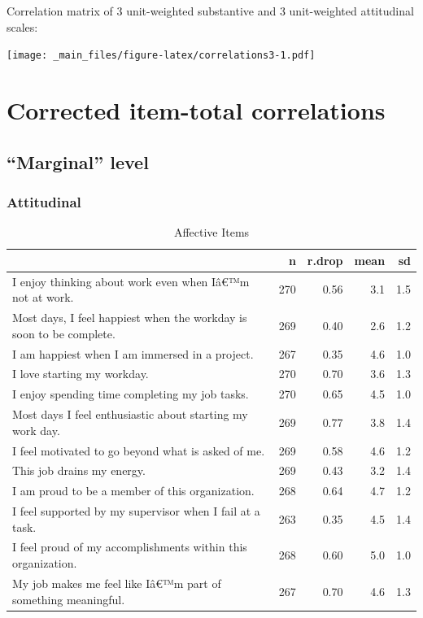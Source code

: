 \documentclass[
]{book}
\begin{document}
Correlation matrix of 3 unit-weighted substantive and 3 unit-weighted attitudinal scales:

\texttt{[image: \_main\_files/figure-latex/correlations3-1.pdf]}

\hypertarget{rdrops}{%
\chapter{Corrected item-total correlations}\label{rdrops}}

\hypertarget{marginal-level}{%
\section{``Marginal'' level}\label{marginal-level}}

\hypertarget{attitudinal}{%
\subsection{Attitudinal}\label{attitudinal}}

\begin{table}

\caption{\label{tab:rdrop1}Affective Items}
\centering
\begin{tabular}[t]{l|r|r|r|r}
\hline
  & n & r.drop & mean & sd\\
\hline
I enjoy thinking about work even when Iâ€™m not at work. & 270 & 0.56 & 3.1 & 1.5\\
\hline
Most days, I feel happiest when the workday is soon to be complete. & 269 & 0.40 & 2.6 & 1.2\\
\hline
I am happiest when I am immersed in a project. & 267 & 0.35 & 4.6 & 1.0\\
\hline
I love starting my workday. & 270 & 0.70 & 3.6 & 1.3\\
\hline
I enjoy spending time completing my job tasks. & 270 & 0.65 & 4.5 & 1.0\\
\hline
Most days I feel enthusiastic about starting my work day. & 269 & 0.77 & 3.8 & 1.4\\
\hline
I feel motivated to go beyond what is asked of me. & 269 & 0.58 & 4.6 & 1.2\\
\hline
This job drains my energy. & 269 & 0.43 & 3.2 & 1.4\\
\hline
I am proud to be a member of this organization. & 268 & 0.64 & 4.7 & 1.2\\
\hline
I feel supported by my supervisor when I fail at a task. & 263 & 0.35 & 4.5 & 1.4\\
\hline
I feel proud of my accomplishments within this organization. & 268 & 0.60 & 5.0 & 1.0\\
\hline
My job makes me feel like Iâ€™m part of something meaningful. & 267 & 0.70 & 4.6 & 1.3\\
\hline
\end{tabular}
\end{table}
\end{document}
